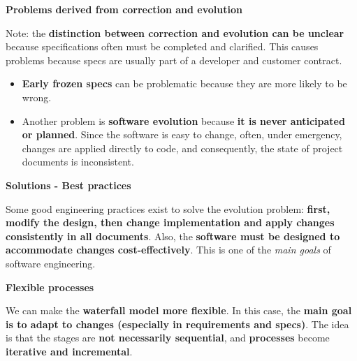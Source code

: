 \documentclass[a4paper]{article}
\begin{document}
    \begin{flushleft}
        \textcolor{Red2}{\textbf{ Problems derived from correction and evolution}}
    \end{flushleft}
    Note: the \textbf{distinction between correction and evolution can be unclear} because specifications often must be completed and clarified. This causes problems because specs are usually part of a developer and customer contract. 
    \begin{itemize}
        \item \textbf{Early frozen specs} can be problematic because they are more likely to be wrong.
        \item Another problem is \textbf{software evolution} because \textbf{it is never anticipated or planned}. Since the software is easy to change, often, under emergency, changes are applied directly to code, and consequently, the state of project documents is inconsistent.
    \end{itemize}

    \begin{flushleft}
        \textcolor{Green3}{ \textbf{Solutions - Best practices}}
    \end{flushleft}
    Some good engineering practices exist to solve the evolution problem: \textbf{first, modify the design, then change implementation and apply changes consistently in all documents}. Also, the \textbf{software must be designed to accommodate changes cost-effectively}. This is one of the \emph{main goals} of software engineering.

    \begin{flushleft}
        \textcolor{Green3}{ \textbf{Flexible processes}}
    \end{flushleft}
    We can make the \textbf{waterfall model more flexible}. In this case, the \textbf{main goal is to adapt to changes (especially in requirements and specs)}.
    The idea is that the stages are \textbf{not necessarily sequential}, and \textbf{processes} become \textbf{iterative and incremental}.


    \newpage

    {}
    

    \newpage

    \printindex
\end{document}
